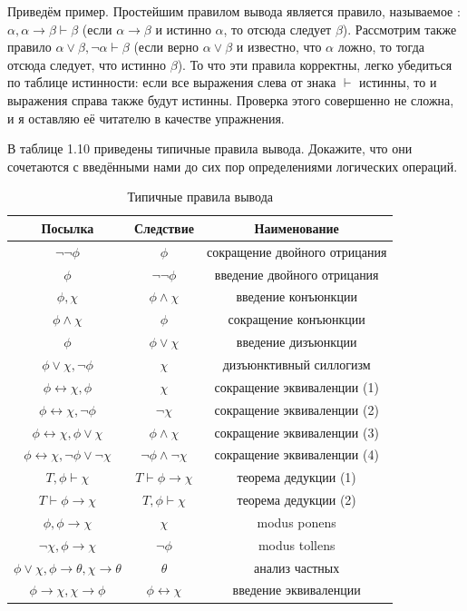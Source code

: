 Приведём пример. Простейшим правилом вывода является правило, называемое : $\alpha, \alpha\to\beta \vdash \beta$ (если $\alpha\to\beta$ и истинно $\alpha$, то отсюда следует $\beta$). Рассмотрим также правило $\alpha\lor\beta, \neg\alpha \vdash \beta$ (если верно $\alpha\lor\beta$ и известно, что $\alpha$ ложно, то тогда отсюда следует, что истинно $\beta$). То что эти правила корректны, легко убедиться по таблице истинности: если все выражения слева от знака $\vdash$ истинны, то и выражения справа также будут истинны. Проверка этого совершенно не сложна, и я оставляю её читателю в качестве упражнения.

\begin{exercise}
В таблице 1.10 приведены типичные правила вывода. Докажите, что они сочетаются с введёнными нами до сих пор определениями логических операций.
\end{exercise}

\begin{table}[h]
\centering
\begin{tabular}{c c | c}
Посылка & Следствие & Наименование \\
\hline
$\neg\neg\phi$ & $\phi$ & сокращение двойного отрицания \\
$\phi$&$\neg\neg\phi$ & введение двойного отрицания \\
$\phi, \chi$ & $\phi \land \chi$ & введение конъюнкции \\
$\phi\land\chi$ & $\phi$ & сокращение конъюнкции \\
$\phi$ &  $\phi\lor\chi$ & введение дизъюнкции \\
$\phi\lor\chi, \neg\phi$ & $\chi$ & дизъюнктивный силлогизм \\
$\phi\leftrightarrow\chi, \phi$  & $\chi$ & сокращение эквиваленции (1) \\
$\phi\leftrightarrow\chi, \neg\phi$  & $\neg\chi$ & сокращение эквиваленции (2) \\
$\phi\leftrightarrow\chi, \phi\lor\chi$  & $\phi\land\chi$ & сокращение эквиваленции (3) \\
$\phi\leftrightarrow\chi, \neg\phi\lor\neg\chi$  & $\neg\phi\land\neg\chi$ & сокращение эквиваленции (4) \\
$T, \phi \vdash \chi$  & $T\vdash \phi\to\chi$ & теорема дедукции (1) \\
$T \vdash \phi\to\chi$  & $T, \phi\vdash\chi$ & теорема дедукции (2) \\
$\phi, \phi\to\chi$ & $\chi$ & modus ponens \\
$\neg \chi, \phi\to\chi$ & $\neg\phi$ & modus tollens \\
$\phi\lor\chi, \phi\to\theta, \chi\to\theta$ & $\theta$ & анализ частных \\
$\phi\to\chi, \chi\to\phi$ & $\phi\leftrightarrow\chi$ & введение эквиваленции
\end{tabular}
\caption{Типичные правила вывода}\label{table:kleene-or}
\end{table}

